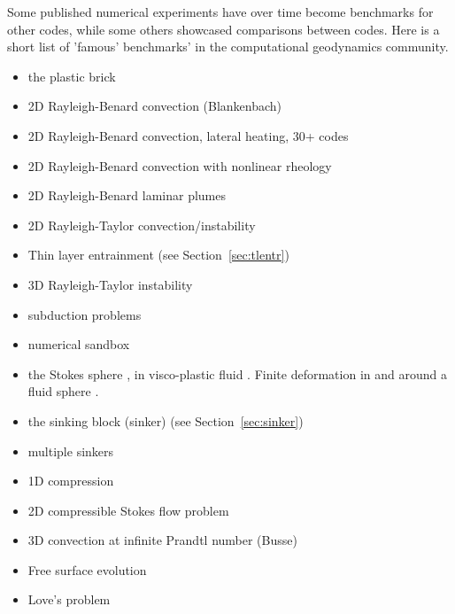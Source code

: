 Some published numerical experiments have over time become benchmarks for other codes, while some 
others showcased comparisons between codes. Here is a short list of 'famous' benchmarks' in the 
computational geodynamics community.

\begin{itemize}
\item the plastic brick \cite{lemm08,kaus10,qurj09,mishin11,muso11,maie12,spmw16,gltf18,frbt19}
\item 2D Rayleigh-Benard convection (Blankenbach)  \cite{blbc89,trha98,chhl08,king09,lezh11,vyrc13,trab90,bepo10,chgs02}
\item 2D Rayleigh-Benard convection, lateral heating, 30+ codes \cite{dejo83}
\item 2D Rayleigh-Benard convection with nonlinear rheology \cite{tosn15,aspectmanual}
\item 2D Rayleigh-Benard laminar plumes \cite{vavl09}
\item 2D Rayleigh-Taylor convection/instability \cite{pros81,trab90,wesc92,popo92,soga01,bast02,taki03,bomh06}
      \cite{basd08,qurj09,saev10,sunh10,como97,lezh11,lomw12,vyrc13,vaks97,bomh06,chtl13,deka08,mishin11}
      \cite{maie12,fusc13,devv00a,dadh07,demh19,aspectmanual}
\item Thin layer entrainment (see Section~\ref{sec:tlentr})
\item 3D Rayleigh-Taylor instability \cite{fukk08,vosc15}
\item subduction problems \cite{scbe08,vack08,cehg14}
\item numerical sandbox \cite{bbeg06,maie12,busa16,gltf18}
\item the Stokes sphere \cite{galemanual,aspectmanual}, in visco-plastic fluid \cite{limd02,bemj04}. 
      Finite deformation in and around a fluid sphere \cite{sccm88,crud88}.
\item the sinking block (sinker) \cite{thie11,cehg14,gery10,geyu03,mamo08,mishin11,fumt11,maie12} (see Section~\ref{sec:sinker})
\item multiple sinkers \cite{mabl14,mabl15}
\item 1D compression \cite{modm02}
\item 2D compressible Stokes flow problem \cite{itki94,tagu07,lezh08,kilv10,lizh13}
\item 3D convection at infinite Prandtl number (Busse) \cite{bucc93,trha98,onmm06,krhb12}
\item Free surface evolution \cite{crsg12,aspectmanual}
\item Love's problem \cite{bebe04}

\end{itemize}
